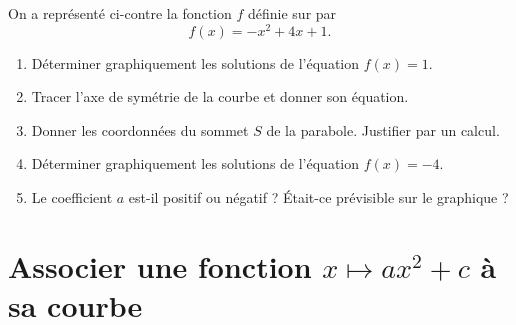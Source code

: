 \documentclass[11pt,a4paper]{book}
\begin{document}
\exerciceDS{}

\begin{minipage}[c]{0.5\linewidth}
	On a représenté ci-contre la fonction $f$ définie sur \R par
	$$f(x)=-x^2+4x+1.$$
	\begin{enumerate}[label=\textbf{\arabic*)}]
		\item Déterminer graphiquement les solutions de l'équation $f(x)=1$.
		\item Tracer l'axe de symétrie de la courbe et donner son équation.
		\item Donner les coordonnées du sommet $S$ de la parabole. Justifier par un calcul.
		\item Déterminer graphiquement les solutions de l'équation $f(x)=-4$.
		\item Le coefficient $a$ est-il positif ou négatif ? Était-ce prévisible sur le graphique ?
	\end{enumerate}
\end{minipage} \hfill
\begin{minipage}[c]{0.46\linewidth}
	\begin{center}
	\end{center}
\end{minipage}

\section*{\color{green!55!black}Associer une fonction $x\mapsto ax^2+c$ à sa courbe}

\exerciceDS{}
\end{document}
